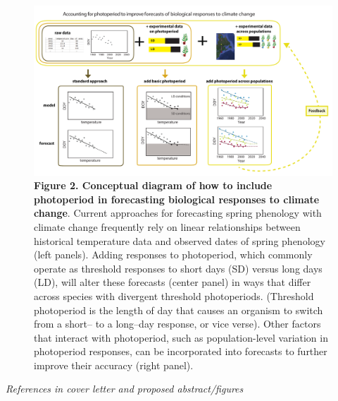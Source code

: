 \documentclass[10.5pt,a4paper]{letter}
\begin{document}
\begin{letter}{}
\begin{footnotesize}
\begin{figure}
\includegraphics[scale=.55]{..//..//..//analyses/photoperiod/figures/photocondiag6.pdf} 
\caption{\textbf{Figure 2. Conceptual diagram of how to include photoperiod in forecasting biological responses to climate change}. Current approaches for forecasting spring phenology with climate change frequently rely on linear relationships between historical temperature data and observed dates of spring phenology (left panels). Adding responses to photoperiod, which commonly operate as threshold responses to short days (SD) versus long days (LD), will alter these forecasts (center panel) in ways that differ across species with divergent threshold photoperiods. (Threshold photoperiod is the length of day that causes an organism to switch from a short-- to a long--day response, or vice verse). Other factors that interact with photoperiod, such as population-level variation in photoperiod responses, can be incorporated into forecasts to further improve their accuracy (right panel).}
\label{fig:condiag}
\end{figure}
 
 \noindent \emph{References in cover letter and proposed abstract/figures}


\end{footnotesize}
\end{letter}
\end{document}
